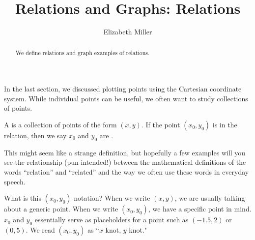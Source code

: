 \documentclass[nooutcomes]{ximera}
\author{Elizabeth Miller}
\title{Relations and Graphs: Relations}
\begin{document}
\begin{abstract}
We define relations and graph examples of relations. 
\end{abstract}
\maketitle


In the last section, we discussed plotting points using the Cartesian coordinate system. While individual points can be useful, we often want to study collections of points.


\begin{definition}
A  is a collection of points of the form $(x,y)$.  If the point $(x_0,y_0)$ is in the relation, then we say $x_0$ and $y_0$ are .
\end{definition}

This might seem like a strange definition, but hopefully a few
examples will you see the relationship (pun intended!) between the
mathematical definitions of the words ``relation'' and ``related'' and the
way we often use these words in everyday speech.

\begin{MM}
What is this $(x_0,y_0)$ notation?  When we write $(x,y)$, we are usually talking about a generic point.  When we write $(x_0,y_0)$, we have a specific point in mind.  $x_0$ and $y_0$ essentially serve as placeholders for a point such as $(-1.5, 2)$ or $(0,5)$. We read $(x_0,y_0)$ as ``$x$ knot, $y$ knot."
\end{MM}
\end{document}
